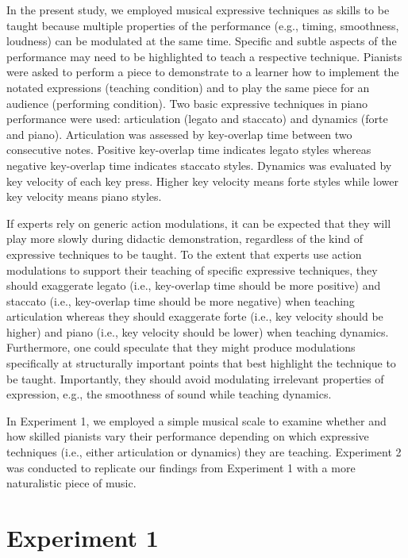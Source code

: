 \documentclass[
  man,floatsintext]{apa6}
\begin{document}
In the present study, we employed musical expressive techniques as skills to be taught because multiple properties of the performance (e.g., timing, smoothness, loudness) can be modulated at the same time. Specific and subtle aspects of the performance may need to be highlighted to teach a respective technique. Pianists were asked to perform a piece to demonstrate to a learner how to implement the notated expressions (teaching condition) and to play the same piece for an audience (performing condition). Two basic expressive techniques in piano performance were used: articulation (legato and staccato) and dynamics (forte and piano). Articulation was assessed by key-overlap time between two consecutive notes. Positive key-overlap time indicates legato styles whereas negative key-overlap time indicates staccato styles. Dynamics was evaluated by key velocity of each key press. Higher key velocity means forte styles while lower key velocity means piano styles.

If experts rely on generic action modulations, it can be expected that they will play more slowly during didactic demonstration, regardless of the kind of expressive techniques to be taught. To the extent that experts use action modulations to support their teaching of specific expressive techniques, they should exaggerate legato (i.e., key-overlap time should be more positive) and staccato (i.e., key-overlap time should be more negative) when teaching articulation whereas they should exaggerate forte (i.e., key velocity should be higher) and piano (i.e., key velocity should be lower) when teaching dynamics. Furthermore, one could speculate that they might produce modulations specifically at structurally important points that best highlight the technique to be taught. Importantly, they should avoid modulating irrelevant properties of expression, e.g., the smoothness of sound while teaching dynamics.

In Experiment 1, we employed a simple musical scale to examine whether and how skilled pianists vary their performance depending on which expressive techniques (i.e., either articulation or dynamics) they are teaching. Experiment 2 was conducted to replicate our findings from Experiment 1 with a more naturalistic piece of music.

\hypertarget{experiment-1}{%
\section{Experiment 1}\label{experiment-1}}
\end{document}
